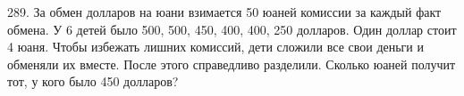 289. За обмен долларов на юани взимается 50 юаней комиссии за каждый факт обмена. У 6 детей было 500, 500, 450, 400, 400, 250 долларов. Один доллар стоит 4 юаня. Чтобы избежать лишних комиссий, дети сложили все свои деньги и обменяли их вместе. После этого справедливо разделили. Сколько юаней получит тот, у кого было 450 долларов?\\
